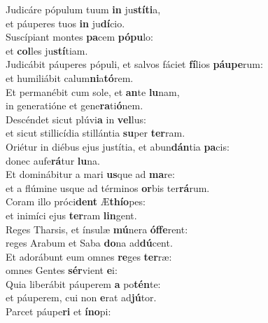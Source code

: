 \evenverse Judicáre pópulum tuum \textbf{in} ju\textbf{stí}\textbf{ti}a,~\*\\
\evenverse et páuperes tuos \textbf{in} ju\textbf{dí}cio.\\
\oddverse Suscípiant montes \textbf{pa}cem \textbf{pó}\textbf{pu}lo:~\*\\
\oddverse et \textbf{col}les ju\textbf{stí}tiam.\\
\evenverse Judicábit páuperes pópuli, et salvos fáciet \textbf{fí}lios \textbf{páu}\textbf{pe}rum:~\*\\
\evenverse et humiliábit calum\textbf{ni}a\textbf{tó}rem.\\
\oddverse Et permanébit cum sole, et \textbf{an}te \textbf{lu}nam,~\*\\
\oddverse in generatióne et gene\textbf{ra}ti\textbf{ó}nem.\\
\evenverse Descéndet sicut plúvi\textbf{a} in \textbf{vel}lus:~\*\\
\evenverse et sicut stillicídia stillántia \textbf{su}per \textbf{ter}ram.\\
\oddverse Oriétur in diébus ejus justítia, et abun\textbf{dán}tia \textbf{pa}cis:~\*\\
\oddverse donec aufe\textbf{rá}tur \textbf{lu}na.\\
\evenverse Et dominábitur a mari \textbf{us}que ad \textbf{ma}re:~\*\\
\evenverse et a flúmine usque ad términos \textbf{or}bis ter\textbf{rá}rum.\\
\oddverse Coram illo próci\textbf{dent} Æ\textbf{thí}\textbf{o}pes:~\*\\
\oddverse et inimíci ejus \textbf{ter}ram \textbf{lin}gent.\\
\evenverse Reges Tharsis, et ínsulæ \textbf{mú}nera \textbf{óf}\textbf{fe}rent:~\*\\
\evenverse reges Arabum et Saba \textbf{do}na ad\textbf{dú}cent.\\
\oddverse Et adorábunt eum omnes \textbf{re}ges \textbf{ter}ræ:~\*\\
\oddverse omnes Gentes \textbf{sér}vient \textbf{e}i:\\
\evenverse Quia liberábit páuperem \textbf{a} po\textbf{tén}te:~\*\\
\evenverse et páuperem, cui non \textbf{e}rat ad\textbf{jú}tor.\\
\oddverse Parcet páupe\textbf{ri} et \textbf{í}\textbf{no}pi:~\*\\
